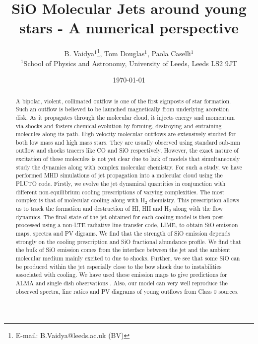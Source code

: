 \documentclass[useAMS,usenatbib,letters]{mn2e}
\begin{document}
\title{SiO Molecular Jets around young stars - A numerical perspective}
\author[B. Vaidya, Tom Douglas, Paola Caselli]{B. Vaidya$^{1}$\thanks{E-mail:
B.Vaidya@leeds.ac.uk (BV)}, Tom Douglas$^{1}$, Paola Caselli$^{1}$\\
$^{1}$School of Physics and Astronomy, University of Leeds, Leeds LS2
9JT\\
}

\date\today

\pagerange{\pageref{firstpage}--\pageref{lastpage}} 


\maketitle

\label{firstpage}

\begin{abstract}
  {A bipolar, violent, collimated outflow is one of the first signposts of star
formation. Such an outflow is believed to be launched magnetically from
underlying accretion disk. As it propagates through the molecular
cloud, it injects energy and momentum via shocks 
and fosters chemical evolution by forming, destroying and entraining
molecules along its path.}  
   {High 
velocity molecular outflows are extensively studied for both low mass
and high mass stars. They are usually observed using standard sub-mm outflow and shocks
tracers like CO and SiO respectively. However, the exact nature of
excitation of these molecules is not yet clear due to lack of models that
simultaneously study the dynamics along with complex molecular chemistry.}
   { For such a study, we have performed MHD simulations
of jet propagation into a molecular cloud using the PLUTO
code. Firstly, we evolve the jet dynamical quantities in conjunction
with different non-equilibrium cooling prescriptions of varying complexities. 
The most complex is that of molecular cooling along with
H$_2$ chemistry. This prescription allows us to track the formation
and destruction of HI, HII and H$_2$ along with the flow dynamics. 
The final state of the jet obtained for each cooling model is then
post-processed using a non-LTE radiative line transfer code, LIME,  to
obtain SiO emission maps, spectra and PV digrams.}
   {We find that the strength of SiO
emission depends strongly on the cooling prescription and SiO fractional
abundance profile. We find that the bulk of SiO emission comes from
the interface between
the jet and the ambient molecular medium mainly excited to due to
shocks. Further, we see that some SiO can be produced within the jet
especially close to the bow shock due to instabilities associated with
cooling. We have used these emission maps to give predictions for ALMA
and single dish observations . Also, our model can very well reproduce the observed 
spectra, line ratios and PV diagrams of young outflows from Class 0 sources.}
\end{abstract}
\end{document}
